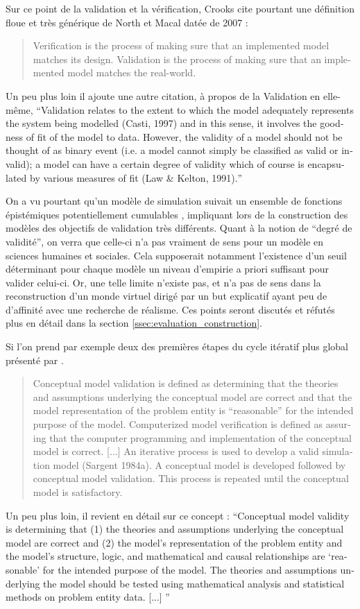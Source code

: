 Sur ce point de la validation et la vérification, Crooks cite pourtant une définition floue et très générique de North et Macal datée de 2007 :

\foreignblockquote{english}[\cite{Crooks2012}]{ Verification is the process of making sure that an implemented model matches its design. Validation is the process of making sure that an implemented model matches the real-world.}. Un peu plus loin il ajoute une autre citation, à propos de la Validation en elle-même, \foreignquote{english}{Validation relates to the extent to which the model adequately represents the system being modelled (Casti, 1997) and in this sense, it involves the goodness of fit of the model to data. However, the validity of a model should not be thought of as binary event (i.e. a model cannot simply be classified as valid or invalid); a model can have a certain degree of validity which of course is encapsulated by various measures of fit (Law \& Kelton, 1991).}

On a vu pourtant qu'un modèle de simulation suivait un ensemble de fonctions épistémiques potentiellement cumulables \autocite{Varenne2013b}, impliquant lors de la construction des modèles des objectifs de validation très différents. Quant à la notion de \enquote{degré de validité}, on verra que celle-ci n'a pas vraiment de sens pour un modèle en sciences humaines et sociales. Cela supposerait notamment l'existence d'un seuil déterminant pour chaque modèle un niveau d'empirie a priori suffisant pour valider celui-ci. Or, une telle limite n'existe pas, et n'a pas de sens dans la reconstruction d'un monde virtuel dirigé par un but explicatif ayant peu de d'affinité avec une recherche de réalisme. Ces points seront discutés et réfutés plus en détail dans la section \ref{ssec:evaluation_construction}.

Si l'on prend par exemple deux des premières étapes du cycle itératif plus global présenté par \textcite{Sargent2010}.

\foreignblockquote{english}[\cite{Sargent2010}]{Conceptual model validation is defined as determining that the theories and assumptions underlying the conceptual model are correct and that the model representation of the problem entity is \enquote{reasonable}  for the intended purpose of the model. Computerized model verification is defined as assuring that the computer programming and implementation of the conceptual model is correct. [...] An iterative process is used to develop a valid simulation model (Sargent 1984a). A conceptual model is developed followed by conceptual model validation. This process is repeated until the conceptual model is satisfactory.} Un peu plus loin, il revient en détail sur ce concept : \foreignquote{english}{Conceptual model validity is determining that (1) the theories and assumptions underlying the conceptual model are correct and (2) the model’s representation of the problem entity and the model’s structure, logic, and mathematical and causal relationships are \enquote{reasonable} for the intended purpose of the model. The theories and assumptions underlying the model should be tested using mathematical analysis and statistical methods on problem entity data. [...] }

